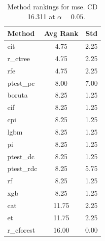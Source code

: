 \begin{table}[h]
\centering
\caption{Method rankings for mse. CD = 16.311 at $\alpha=0.05$.}
\label{tab:ranks_mse}
\begin{tabular}{lcc}
\toprule
Method & Avg Rank & Std \\
\midrule
cit & 4.75 & 2.25 \\
r_ctree & 4.75 & 2.25 \\
rfe & 4.75 & 2.25 \\
ptest_pc & 8.00 & 7.00 \\
boruta & 8.25 & 1.25 \\
cif & 8.25 & 1.25 \\
cpi & 8.25 & 1.25 \\
lgbm & 8.25 & 1.25 \\
pi & 8.25 & 1.25 \\
ptest_dc & 8.25 & 1.25 \\
ptest_rdc & 8.25 & 5.75 \\
rf & 8.25 & 1.25 \\
xgb & 8.25 & 1.25 \\
cat & 11.75 & 2.25 \\
et & 11.75 & 2.25 \\
r_cforest & 16.00 & 0.00 \\
\bottomrule
\end{tabular}
\end{table}